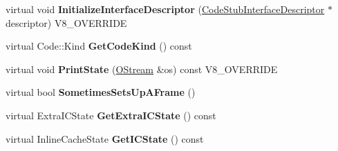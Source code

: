 \begin{DoxyCompactItemize}
\item 
\hypertarget{classv8_1_1internal_1_1_to_boolean_stub_a6e929d3c28b4c19bc9367b0862ac478e}{}virtual void {\bfseries Initialize\+Interface\+Descriptor} (\hyperlink{classv8_1_1internal_1_1_code_stub_interface_descriptor}{Code\+Stub\+Interface\+Descriptor} $\ast$descriptor) V8\+\_\+\+O\+V\+E\+R\+R\+I\+D\+E\label{classv8_1_1internal_1_1_to_boolean_stub_a6e929d3c28b4c19bc9367b0862ac478e}

\item 
\hypertarget{classv8_1_1internal_1_1_to_boolean_stub_acce16c9bd33b1d2226d5b1cda4497e00}{}virtual Code\+::\+Kind {\bfseries Get\+Code\+Kind} () const \label{classv8_1_1internal_1_1_to_boolean_stub_acce16c9bd33b1d2226d5b1cda4497e00}

\item 
\hypertarget{classv8_1_1internal_1_1_to_boolean_stub_a0d084a58961fca9cc203a8d37f15cd56}{}virtual void {\bfseries Print\+State} (\hyperlink{classv8_1_1internal_1_1_o_stream}{O\+Stream} \&os) const V8\+\_\+\+O\+V\+E\+R\+R\+I\+D\+E\label{classv8_1_1internal_1_1_to_boolean_stub_a0d084a58961fca9cc203a8d37f15cd56}

\item 
\hypertarget{classv8_1_1internal_1_1_to_boolean_stub_a62057d58940bffd56c5d7bb309d5fa3d}{}virtual bool {\bfseries Sometimes\+Sets\+Up\+A\+Frame} ()\label{classv8_1_1internal_1_1_to_boolean_stub_a62057d58940bffd56c5d7bb309d5fa3d}

\item 
\hypertarget{classv8_1_1internal_1_1_to_boolean_stub_af5c3e781999d1cf782b0e41a0e532856}{}virtual Extra\+I\+C\+State {\bfseries Get\+Extra\+I\+C\+State} () const \label{classv8_1_1internal_1_1_to_boolean_stub_af5c3e781999d1cf782b0e41a0e532856}

\item 
\hypertarget{classv8_1_1internal_1_1_to_boolean_stub_ad49768f1db3903c1bab9d33008c44740}{}virtual Inline\+Cache\+State {\bfseries Get\+I\+C\+State} () const \label{classv8_1_1internal_1_1_to_boolean_stub_ad49768f1db3903c1bab9d33008c44740}

\end{DoxyCompactItemize}
